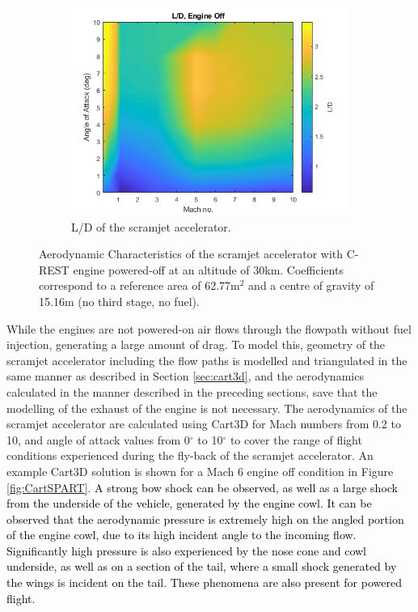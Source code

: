 \begin{figure}[ht]
\begin{subfigure}{.5\textwidth}
		\centering
		\includegraphics[width=0.99\linewidth]{figures/3_vehicle_design/LD}
		\caption{L/D of the scramjet accelerator.}
		\label{fig:LD}
	\end{subfigure}
	\caption{Aerodynamic Characteristics of the scramjet accelerator with C-REST engine powered-off at an altitude of 30km. Coefficients correspond to a reference area of 62.77m$^2$ and a centre of gravity of 15.16m (no third stage, no fuel).} %
	\label{fig:aero1}
\end{figure}


 While the engines are not powered-on air flows through the flowpath without fuel injection, generating a large amount of drag. To model this, geometry of the scramjet accelerator including the flow paths is modelled and triangulated in the same manner as described in Section \ref{sec:cart3d}, and the aerodynamics calculated in the manner described in the preceding sections, save that the modelling of the exhaust of the engine is not necessary.
The aerodynamics of the scramjet accelerator are calculated using Cart3D for Mach numbers from 0.2 to 10, and angle of attack values from 0$^\circ$ to 10$^\circ$ to cover the range of flight conditions experienced during the fly-back of the scramjet accelerator.  An example Cart3D solution is shown for a Mach 6 engine off condition in Figure \ref{fig:CartSPART}. \textcolor{black}{A strong bow shock can be observed, as well as a large shock from the underside of the vehicle, generated by the engine cowl. It can be observed that the aerodynamic pressure is extremely high on the angled portion of the engine cowl, due to its high incident angle to the incoming flow. Significantly high pressure is also experienced by the nose cone and cowl underside, as well as on a section of the tail, where a small shock generated by the wings is incident on the tail. These phenomena are also present for powered flight.}

